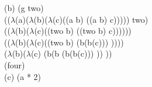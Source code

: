 \documentclass[12pt]{article}
\begin{document}
\noindent (b) (g two)\\
(($\lambda$(a)($\lambda$(b)($\lambda$(c)((a b) ((a b) c))))) two)\\
(($\lambda$(b)($\lambda$(c)((two b) ((two b) c))))))\\
(($\lambda$(b)($\lambda$(c)((two b) (b(b(c))) ))))\\
($\lambda$(b)($\lambda$(c) (b(b (b(b(c))) )) ))\\
(four)\\


\noindent (c) (a * 2)


\end{document}
